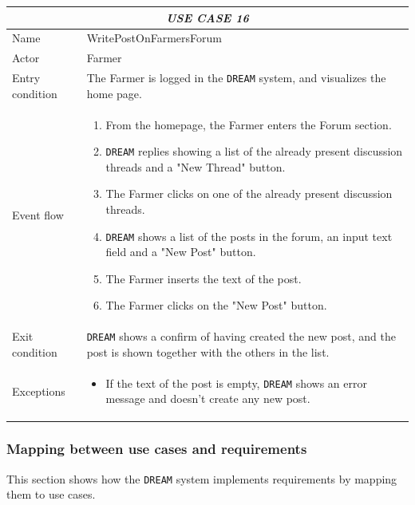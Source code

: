 \documentclass{article}
\begin{document}
\centering
\begin{longtable}{|p{3.5cm}|m{8cm}|}
 \hline
 \multicolumn{2}{|c|}{\cellcolor{white}\emph{USE CASE 16}} \\
 \endfirsthead
 \endhead
 \endfoot
 \endlastfoot
 \hline
 Name & WritePostOnFarmersForum\\
 \hline
 Actor & Farmer\\
 \hline
 Entry condition & The Farmer is logged in the \verb|DREAM| system, and visualizes the home page.\\
 \hline
 Event flow & \begin{enumerate}
    \item From the homepage, the Farmer enters the Forum section.
    \item \verb|DREAM| replies showing a list of the already present discussion threads and a "New Thread" button.
    \item The Farmer clicks on one of the already present discussion threads.
    \item \verb|DREAM| shows a list of the posts in the forum, an input text field and a "New Post" button.
    \item The Farmer inserts the text of the post.
    \item The Farmer clicks on the "New Post" button.
 \end{enumerate}\\
 \hline
 Exit condition & \verb|DREAM| shows a confirm of having created the new post, and the post is shown together with the others in the list.\\
 \hline
 Exceptions & \begin{itemize}
     \item If the text of the post is empty, \verb|DREAM| shows an error message and doesn't create any new post.
 \end{itemize}\\
 \hline
\end{longtable}

\subsubsection{Mapping between use cases and requirements}
This section shows how the \verb|DREAM| system implements requirements by mapping them to use cases.
\end{document}
